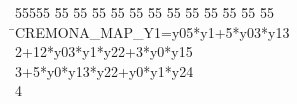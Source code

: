 %
%
\begin{tabbing}
55555 \= 55 \= 55 \= 55 \= 55 \= 55 \= 55 \= 55 \= 55 \= 55 \= 55 \= 55 \= 55 \= \>CREMONA\_MAP\_Y1=y05*y1+5*y03*y13\\[0pt]
2\>+12*y03*y1*y22+3*y0*y15\\[0pt]
3\>+5*y0*y13*y22+y0*y1*y24\\[0pt]
4\>\end{tabbing}
